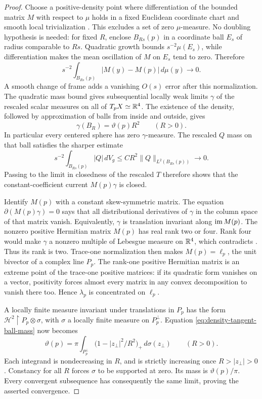 \begin{proof}
Choose a positive-density point where differentiation of the bounded
matrix \(M\) with respect to \(\mu\) holds in a fixed Euclidean
coordinate chart and smooth local trivialization
\cite[Theorem~4.33 and Corollary~4.34]{Kinnunen2026}. This excludes a
set of zero \(\mu\)-measure. No doubling hypothesis is needed: for
fixed \(R\), enclose \(B_{Rs}(p)\) in a coordinate ball \(E_s\) of
radius comparable to \(Rs\). Quadratic growth bounds
\(s^{-2}\mu(E_s)\), while differentiation makes the mean oscillation
of \(M\) on \(E_s\) tend to zero. Therefore
\[
 s^{-2}\int_{B_{Rs}(p)}|M(y)-M(p)|\,d\mu(y)\longrightarrow0.
\]
A smooth change of frame adds a vanishing \(O(s)\) error after this
normalization. The
quadratic mass bound gives subsequential locally weak limits
\(\gamma\) of the rescaled scalar measures on all of \(T_pX\simeq\mathbb R^4\).
The existence of the density, followed by approximation of balls from
inside and outside, gives
\begin{equation}\label{eq:density-tangent-ball-mass}
 \gamma(B_R)=\vartheta(p)R^2\qquad(R>0).
\end{equation}
In particular every centered sphere has zero \(\gamma\)-measure.
The rescaled \(Q\) mass on that ball satisfies the sharper estimate
\begin{equation}\label{eq:density-rescaled-correction}
 s^{-2}\int_{B_{Rs}(p)}|Q|\,dV_g
 \le CR^2\|Q\|_{L^2(B_{Rs}(p))}\longrightarrow0.
\end{equation}
Passing to the limit in closedness of the rescaled \(T\) therefore
shows that the constant-coefficient current \(M(p)\gamma\) is closed.

Identify \(M(p)\) with a constant skew-symmetric matrix.  The equation
\(\partial(M(p)\gamma)=0\) says that all distributional derivatives
of \(\gamma\) in the column space of that matrix vanish.  Equivalently,
\(\gamma\) is translation invariant along \(\operatorname{im} M(p)\).
The nonzero positive Hermitian matrix \(M(p)\) has real rank two or
four.  Rank four would make \(\gamma\) a nonzero multiple of Lebesgue
measure on \(\mathbb R^4\), which contradicts
.  Thus its rank is two.
Trace-one normalization then makes \(M(p)=\ell_p\), the unit bivector
of a complex line \(P_p\).  The rank-one positive Hermitian matrix is
an extreme point of the trace-one positive matrices: if its
quadratic form vanishes on a vector, positivity forces almost every
matrix in any convex decomposition to vanish there too.  Hence
\(\lambda_p\) is concentrated on \(\ell_p\).

A locally finite measure invariant under translations in \(P_p\)
has the form
\(\mathcal H^2\!\restriction P_p\otimes\sigma\), with \(\sigma\) a
locally finite measure on \(P_p^\perp\).  Equation
\eqref{eq:density-tangent-ball-mass} now becomes
\[
 \vartheta(p)=
 \pi\int_{P_p^\perp}
       \bigl(1-|z_\perp|^2/R^2\bigr)_+\,d\sigma(z_\perp)
 \qquad(R>0).
\]
Each integrand is nondecreasing in \(R\), and is strictly increasing
once \(R>|z_\perp|>0\).  Constancy for all \(R\) forces \(\sigma\)
to be supported at zero.  Its mass is \(\vartheta(p)/\pi\).
Every convergent subsequence has consequently the same limit, proving
the asserted convergence.
\end{proof}

